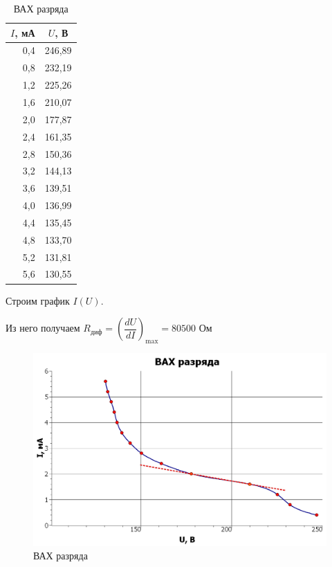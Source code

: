 \documentclass[a4paper,12pt]{article} %
\begin{document}
\begin{table}[h!]
	\centering
	\begin{tabular}{|r|r|}
		\hline
		\multicolumn{1}{|c|}{$I$, мА} & \multicolumn{1}{c|}{$U$, В} \\ \hline
		0,4                           & 246,89                       \\ \hline
		0,8                           & 232,19                       \\ \hline
		1,2                           & 225,26                      \\ \hline
		1,6                           & 210,07                      \\ \hline
		2,0                           & 177,87                      \\ \hline
		2,4                           & 161,35                      \\ \hline
		2,8                           & 150,36                      \\ \hline
		3,2                           & 144,13                      \\ \hline
		3,6                           & 139,51                      \\ \hline
		4,0                           & 136,99                      \\ \hline
		4,4                           & 135,45                      \\ \hline
		4,8                           & 133,70                      \\ \hline
		5,2                           & 131,81                      \\ \hline
		5,6                           & 130,55                      \\ \hline
	\end{tabular}
\caption{ВАХ разряда}
\end{table}

Строим график $I(U)$.

Из него получаем $\boxed{R_{\text{диф}} = \left(\dfrac{dU}{dI}\right)_{\text{max}} = 80500 \text{ Ом}}$

\newpage
\begin{figure}[h!]
	\centering
	\includegraphics[scale=0.6]{Pictures/ВАХ_1.jpg}
	\caption{ВАХ разряда}
\end{figure}
\end{document}
